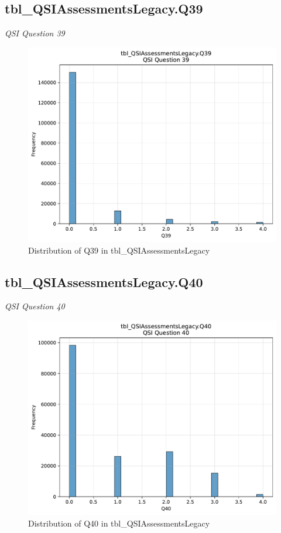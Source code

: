 \subsection{tbl\_QSIAssessmentsLegacy.Q39}
\textit{QSI Question 39}

\begin{figure}[htbp]
\centering
\includegraphics[width=\textwidth]{figures/dbo_tbl_QSIAssessmentsLegacy_Q39.pdf}
\caption{Distribution of Q39 in tbl\_QSIAssessmentsLegacy}
\end{figure}\newpage

\subsection{tbl\_QSIAssessmentsLegacy.Q40}
\textit{QSI Question 40}

\begin{figure}[htbp]
\centering
\includegraphics[width=\textwidth]{figures/dbo_tbl_QSIAssessmentsLegacy_Q40.pdf}
\caption{Distribution of Q40 in tbl\_QSIAssessmentsLegacy}
\end{figure}\newpage

